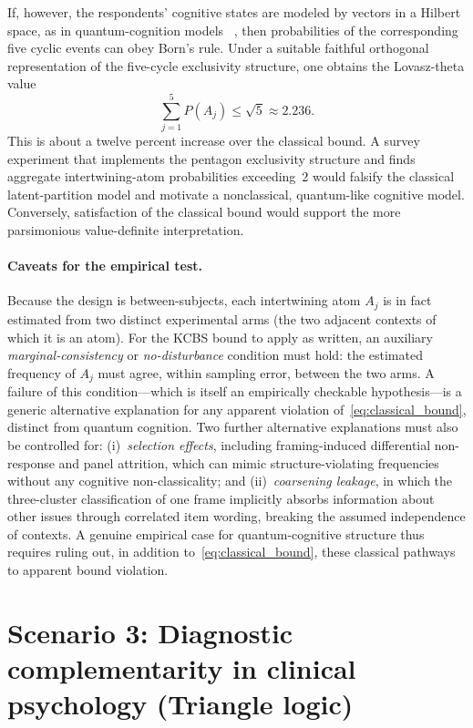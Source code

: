 \documentclass[aps,pra,twocolumn,superscriptaddress,floatfix,longbibliography]{revtex4-2}
\begin{document}
If, however, the respondents' cognitive states are modeled by
vectors in a Hilbert space, as in quantum-cognition models
~\cite{Busemeyer2012}, then probabilities of the corresponding
five cyclic events can obey Born's rule. Under a suitable faithful
orthogonal representation of the five-cycle exclusivity structure,
one obtains the Lovasz-theta value
\begin{equation}
\sum_{j=1}^{5} P(A_j) \leq \sqrt{5}
\approx 2.236.
\label{eq:quantum_bound}
\end{equation}
This is about a twelve percent increase over the classical bound. A
survey experiment that implements the pentagon exclusivity structure
and finds aggregate intertwining-atom probabilities exceeding~2
would falsify the classical latent-partition model and motivate a
nonclassical, quantum-like cognitive model. Conversely, satisfaction
of the classical bound would support the more parsimonious
value-definite interpretation.

\paragraph{Caveats for the empirical test.}
Because the design is between-subjects, each intertwining atom
$A_j$ is in fact estimated from two distinct experimental arms (the
two adjacent contexts of which it is an atom). For the KCBS bound
to apply as written, an auxiliary \emph{marginal-consistency} or
\emph{no-disturbance} condition must hold: the estimated frequency
of $A_j$ must agree, within sampling error, between the two arms.
A failure of this condition---which is itself an empirically
checkable hypothesis---is a generic alternative explanation for any
apparent violation of~\eqref{eq:classical_bound}, distinct from
quantum cognition. Two further alternative explanations must also
be controlled for: (i)~\emph{selection effects}, including
framing-induced differential non-response and panel attrition, which
can mimic structure-violating frequencies without any cognitive
non-classicality; and (ii)~\emph{coarsening leakage}, in which the
three-cluster classification of one frame implicitly absorbs
information about other issues through correlated item wording,
breaking the assumed independence of contexts. A genuine empirical
case for quantum-cognitive structure thus requires ruling out, in
addition to~\eqref{eq:classical_bound}, these classical pathways to
apparent bound violation.

\section{Scenario 3: Diagnostic complementarity in clinical psychology
(Triangle logic)}
\label{sec:clinical}
\end{document}

